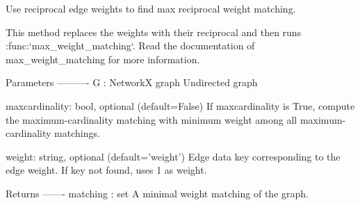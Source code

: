 \begin{DoxyVerb}Use reciprocal edge weights to find max reciprocal weight matching.

This method replaces the weights with their reciprocal and
then runs :func:`max_weight_matching`.
Read the documentation of max_weight_matching for more information.

Parameters
----------
G : NetworkX graph
  Undirected graph

maxcardinality: bool, optional (default=False)
   If maxcardinality is True, compute the maximum-cardinality matching
   with minimum weight among all maximum-cardinality matchings.

weight: string, optional (default='weight')
   Edge data key corresponding to the edge weight.
   If key not found, uses 1 as weight.

Returns
-------
matching : set
    A minimal weight matching of the graph.
\end{DoxyVerb}
 